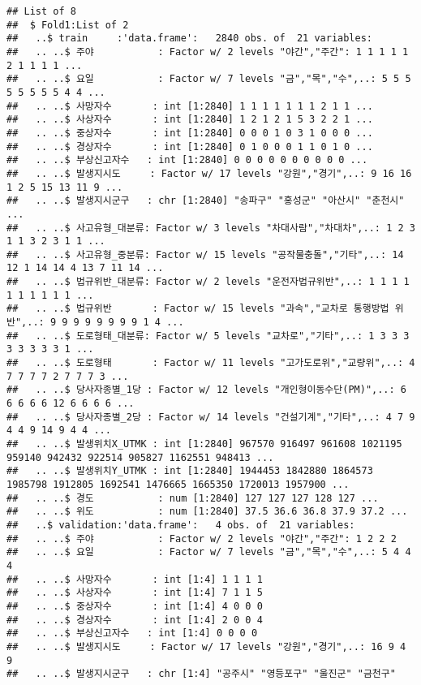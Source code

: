 \documentclass[]{article}
\begin{document}
\begin{verbatim}
## List of 8
##  $ Fold1:List of 2
##   ..$ train     :'data.frame':   2840 obs. of  21 variables:
##   .. ..$ 주야           : Factor w/ 2 levels "야간","주간": 1 1 1 1 1 2 1 1 1 1 ...
##   .. ..$ 요일           : Factor w/ 7 levels "금","목","수",..: 5 5 5 5 5 5 5 5 4 4 ...
##   .. ..$ 사망자수       : int [1:2840] 1 1 1 1 1 1 1 2 1 1 ...
##   .. ..$ 사상자수       : int [1:2840] 1 2 1 2 1 5 3 2 2 1 ...
##   .. ..$ 중상자수       : int [1:2840] 0 0 0 1 0 3 1 0 0 0 ...
##   .. ..$ 경상자수       : int [1:2840] 0 1 0 0 0 1 1 0 1 0 ...
##   .. ..$ 부상신고자수   : int [1:2840] 0 0 0 0 0 0 0 0 0 0 ...
##   .. ..$ 발생지시도     : Factor w/ 17 levels "강원","경기",..: 9 16 16 1 2 5 15 13 11 9 ...
##   .. ..$ 발생지시군구   : chr [1:2840] "송파구" "홍성군" "아산시" "춘천시" ...
##   .. ..$ 사고유형_대분류: Factor w/ 3 levels "차대사람","차대차",..: 1 2 3 1 1 3 2 3 1 1 ...
##   .. ..$ 사고유형_중분류: Factor w/ 15 levels "공작물충돌","기타",..: 14 12 1 14 14 4 13 7 11 14 ...
##   .. ..$ 법규위반_대분류: Factor w/ 2 levels "운전자법규위반",..: 1 1 1 1 1 1 1 1 1 1 ...
##   .. ..$ 법규위반       : Factor w/ 15 levels "과속","교차로 통행방법 위반",..: 9 9 9 9 9 9 9 9 1 4 ...
##   .. ..$ 도로형태_대분류: Factor w/ 5 levels "교차로","기타",..: 1 3 3 3 3 3 3 3 3 1 ...
##   .. ..$ 도로형태       : Factor w/ 11 levels "고가도로위","교량위",..: 4 7 7 7 7 2 7 7 7 3 ...
##   .. ..$ 당사자종별_1당 : Factor w/ 12 levels "개인형이동수단(PM)",..: 6 6 6 6 6 12 6 6 6 6 ...
##   .. ..$ 당사자종별_2당 : Factor w/ 14 levels "건설기계","기타",..: 4 7 9 4 4 9 14 9 4 4 ...
##   .. ..$ 발생위치X_UTMK : int [1:2840] 967570 916497 961608 1021195 959140 942432 922514 905827 1162551 948413 ...
##   .. ..$ 발생위치Y_UTMK : int [1:2840] 1944453 1842880 1864573 1985798 1912805 1692541 1476665 1665350 1720013 1957900 ...
##   .. ..$ 경도           : num [1:2840] 127 127 127 128 127 ...
##   .. ..$ 위도           : num [1:2840] 37.5 36.6 36.8 37.9 37.2 ...
##   ..$ validation:'data.frame':   4 obs. of  21 variables:
##   .. ..$ 주야           : Factor w/ 2 levels "야간","주간": 1 2 2 2
##   .. ..$ 요일           : Factor w/ 7 levels "금","목","수",..: 5 4 4 4
##   .. ..$ 사망자수       : int [1:4] 1 1 1 1
##   .. ..$ 사상자수       : int [1:4] 7 1 1 5
##   .. ..$ 중상자수       : int [1:4] 4 0 0 0
##   .. ..$ 경상자수       : int [1:4] 2 0 0 4
##   .. ..$ 부상신고자수   : int [1:4] 0 0 0 0
##   .. ..$ 발생지시도     : Factor w/ 17 levels "강원","경기",..: 16 9 4 9
##   .. ..$ 발생지시군구   : chr [1:4] "공주시" "영등포구" "울진군" "금천구"

\end{verbatim}
\end{document}
